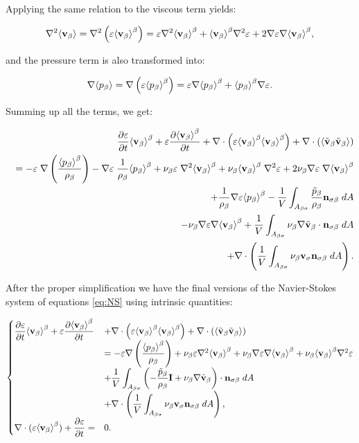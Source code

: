Applying the same relation to the viscous term yields:

\begin{equation}
	\nabla^2 {\left< \textbf{v}_{\beta} \right>} = \nabla^2 \left( \varepsilon {\left< \textbf{v}_{\beta}\right>}^{\beta} \right) = \varepsilon \nabla^2 {\left< \textbf{v}_{\beta} \right>}^{\beta} + {\left< \textbf{v}_{\beta} \right>}^{\beta} \nabla^2 \varepsilon +2 \nabla \varepsilon \nabla {\left< \textbf{v}_{\beta}\right>}^{\beta},
\end{equation}

and the pressure term is also transformed into:

\begin{equation}
\nabla {\left< p_{\beta}\right>} = \nabla \left( \varepsilon {\left< p_{\beta}\right>}^{\beta} \right) = \varepsilon \nabla {\left< p_{\beta}\right>}^{\beta} + {\left< p_{\beta} \right>}^{\beta} \nabla \varepsilon.
\end{equation}

Summing up all the terms, we get:

\begin{eqnarray}
&& \dfrac{\partial \varepsilon}{\partial t}{\left< \textbf{v}_{\beta} \right>}^{\beta} + \varepsilon \dfrac{\partial {\left< \textbf{v}_{\beta}\right>}^{\beta}}{\partial t} + \nabla \cdot \left(\varepsilon {\left< \textbf{v}_{\beta}\right>}^{\beta}{\left< \textbf{v}_{\beta} \right>}^{\beta}\right)   + \nabla \cdot \left({\left< \tilde{\textbf{v}}_{\beta} \tilde{\textbf{v}}_{\beta} \right>}\right)  \nonumber \\
&&= -\varepsilon \; \nabla \left(\dfrac{{\left< p_{\beta} \right>}^{\beta}}{\rho_{\beta}}\right) - \nabla \varepsilon \; \dfrac{1}{\rho_{\beta}} {\left< p_{\beta} \right>}^{\beta}  + \nu_{\beta} \varepsilon \; \nabla^2 {\left< \textbf{v}_{\beta} \right>}^{\beta} + \nu_{\beta} {\left< \textbf{v}_{\beta} \right>}^{\beta} \; \nabla^2 \varepsilon + 2 \nu_{\beta} \nabla \varepsilon \; \nabla {\left< \textbf{v}_{\beta}\right>}^{\beta} \nonumber \\
&&+\dfrac{1}{\rho_{\beta}}\nabla\varepsilon {\left< p_{\beta}\right>}^{\beta} - \dfrac{1}{V} \int_{A_{\beta \sigma}} \dfrac{\tilde{p}_{\beta}}{\rho_{\beta}} \mathbf{n}_{\sigma \beta} \;dA \nonumber \\
&&- \nu_{\beta} \nabla \varepsilon \nabla {\left< \textbf{v}_{\beta}\right>}^{\beta} + \dfrac{1}{V} \int_{A_{\beta \sigma}} \nu_{\beta} \nabla \tilde{\textbf{v}}_{\beta} \cdot \mathbf{n}_{\sigma \beta} \;dA \nonumber \\
&& + \nabla \cdot \left( \dfrac{1}{V} \int_{A_{\beta \sigma}}  \nu_{\beta} \textbf{v}_{\sigma} \mathbf{n}_{\sigma \beta} \;dA \right).
\end{eqnarray}

After the proper simplification we have the final versions of the Navier-Stokes system of equations \eqref{eq:NS} using intrinsic quantities:

\begin{eqnarray}
\begin{cases}
 \derp{\varepsilon}{t}\meani{\vb} + \varepsilon \derp{\meani{\vb}}{t} &+ \nabla \cdot \left(\varepsilon \meani{\vb}\meani{\vb}\right)   + \nabla \cdot \left(\means{\vbt \vbt}\right)   \\
&= -\varepsilon \nabla \left(\dfrac{\meani{\pb}}{\rho_{\beta}}\right) + \nub \varepsilon \nabla^2 \meani{\vb} +  \nub \nabla \varepsilon \nabla \meani{\vb} + \nub \meani{\vb} \nabla^2 \varepsilon  \\
&+ \dfrac{1}{V} \displaystyle\int_{A_{\beta \sigma}} \left(-\dfrac{\pbt}{\rho_{\beta}} \mathbf{I}  + \nub \nabla \vbt \right)\cdot \nbs \;dA \\
& + \nabla \cdot \left( \dfrac{1}{V} \displaystyle\int_{A_{\beta \sigma}}  \nub \ws \nbs \;dA \right), \\
\nabla \cdot (\varepsilon\meani{\vb} ) + \derp{\varepsilon}{t} = &0.
\end{cases}
\label{eq:vans_mom_1}
\end{eqnarray}


